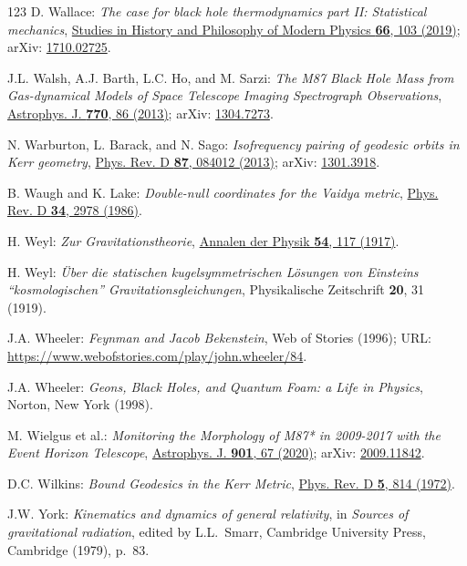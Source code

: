 \begin{thebibliography}{123}
D. Wallace:
{\em The case for black hole thermodynamics part II: Statistical mechanics},
\href{https://doi.org/10.1016/j.shpsb.2018.10.006}{Studies in History and Philosophy of Modern Physics {\bf 66}, 103 (2019)};
arXiv: \href{https://arxiv.org/abs/1710.02725}{1710.02725}.

J.L. Walsh, A.J. Barth, L.C. Ho, and M. Sarzi:
{\em The M87 Black Hole Mass from Gas-dynamical Models of Space Telescope Imaging Spectrograph Observations},
\href{https://doi.org/10.1088/0004-637X/770/2/86}{Astrophys. J. {\bf 770}, 86 (2013)};
arXiv: \href{https://arxiv.org/abs/1304.7273}{1304.7273}.

N. Warburton, L. Barack, and N. Sago:
{\em Isofrequency pairing of geodesic orbits in Kerr geometry},
\href{https://doi.org/10.1103/PhysRevD.87.084012}{Phys. Rev. D {\bf 87}, 084012 (2013)};
arXiv: \href{https://arxiv.org/abs/1301.3918}{1301.3918}.

B. Waugh and K. Lake:
{\em Double-null coordinates for the Vaidya metric},
\href{https://doi.org/10.1103/PhysRevD.34.2978}{Phys. Rev. D {\bf 34}, 2978 (1986)}.

H. Weyl:
{\em Zur Gravitationstheorie},
\href{https://doi.org/10.1002/andp.19173591804}{Annalen der Physik {\bf 54}, 117 (1917)}.

H. Weyl:
{\em \"Uber die statischen kugelsymmetrischen L\"osungen von Einsteins ``kosmologischen'' Gravitationsgleichungen},
Physikalische Zeitschrift {\bf 20}, 31 (1919).

J.A. Wheeler:
{\em Feynman and Jacob Bekenstein},
Web of Stories (1996);
URL: \url{https://www.webofstories.com/play/john.wheeler/84}.

J.A. Wheeler:
{\em Geons, Black Holes, and Quantum Foam: a Life in Physics},
Norton, New York (1998).

M. Wielgus et al.:
{\em Monitoring the Morphology of M87* in 2009-2017 with the Event Horizon Telescope},
\href{https://doi.org/10.3847/1538-4357/abac0d}{Astrophys. J. {\bf 901}, 67 (2020)};
arXiv: \href{https://arxiv.org/abs/2009.11842}{2009.11842}.

D.C. Wilkins:
{\em Bound Geodesics in the Kerr Metric},
\href{https://doi.org/10.1103/PhysRevD.5.814}{Phys. Rev. D {\bf 5}, 814 (1972)}.

J.W. York:
{\em Kinematics and dynamics of general relativity},
in {\em Sources of gravitational radiation}, edited by L.L.~Smarr,
Cambridge University Press, Cambridge (1979), p.~83.


\end{thebibliography}
